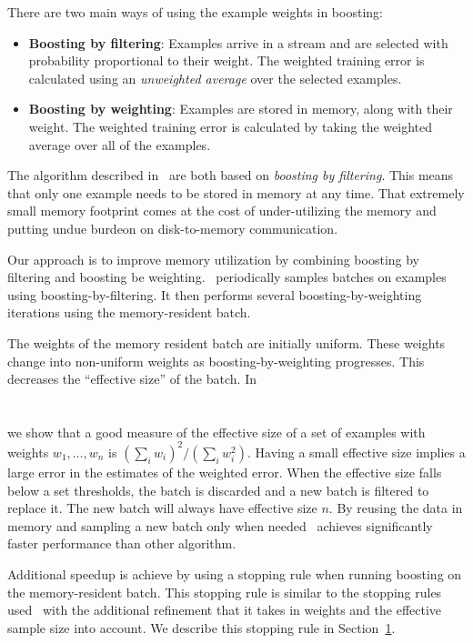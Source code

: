 There are two main ways of using the example weights in boosting:
\begin{itemize}
\item {\bf Boosting by filtering}: Examples arrive in a stream and are
  selected with probability proportional to their weight. The weighted
  training error is calculated using an {\em unweighted average} over
  the selected examples.
\item {\bf Boosting by weighting}: Examples are stored in memory,
  along with their weight. The weighted training error is calculated
  by taking the weighted average over all of the examples.
\end{itemize}
The algorithm described
in~\cite{domingo_scaling_2000,bradley_filterboost:_2007} are both
based on {\em boosting by filtering}. This means that only one example
needs to be stored in memory at any time. That extremely small memory
footprint comes at the cost of under-utilizing the memory and putting
undue burdeon on disk-to-memory communication.

Our approach is to improve memory utilization by combining boosting by
filtering and boosting be weighting. \Sparrow\ periodically samples
batches on examples using boosting-by-filtering. It then performs several
boosting-by-weighting iterations using the memory-resident batch.

The weights of the memory resident batch are initially uniform. These
weights change into non-uniform weights as boosting-by-weighting
progresses. This decreases the ``effective size'' of the batch. In
~\section{} we show that a good measure of the effective size of a
set of examples with weights $w_1,\ldots,w_n$ is $(\sum_i w_i)^2 /
(\sum_i w_i^2)$. Having a small effective size implies a large error
in the estimates of the weighted error. When the effective size falls
below a set thresholds, the batch is discarded and a new batch is
filtered to replace it. The new batch will always have effective size
$n$. By reusing the data in memory and sampling a new batch only when
needed \Sparrow\ achieves significantly faster performance than
other algorithm.

Additional speedup is achieve by using a stopping rule when
running boosting on the memory-resident batch. This stopping rule is
similar to the stopping rules
used~\cite{domingo_scaling_2000,bradley_filterboost:_2007} with the
additional refinement that it takes in weights and the effective
sample size into account. We describe this stopping rule in Section~\ref{}.


